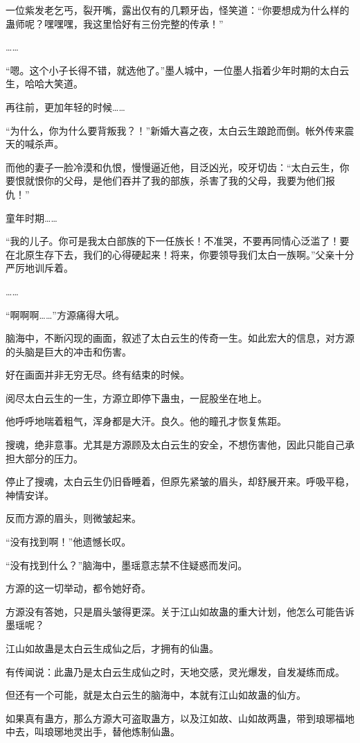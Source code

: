 \begin{this_body}
一位紫发老乞丐，裂开嘴，露出仅有的几颗牙齿，怪笑道：“你要想成为什么样的蛊师呢？嘿嘿嘿，我这里恰好有三份完整的传承！”

……

“嗯。这个小子长得不错，就选他了。”墨人城中，一位墨人指着少年时期的太白云生，哈哈大笑道。

再往前，更加年轻的时候……

“为什么，你为什么要背叛我？！”新婚大喜之夜，太白云生踉跄而倒。帐外传来震天的喊杀声。

而他的妻子一脸冷漠和仇恨，慢慢逼近他，目泛凶光，咬牙切齿：“太白云生，你要恨就恨你的父母，是他们吞并了我的部族，杀害了我的父母，我要为他们报仇！”

童年时期……

“我的儿子。你可是我太白部族的下一任族长！不准哭，不要再同情心泛滥了！要在北原生存下去，我们的心得硬起来！将来，你要领导我们太白一族啊。”父亲十分严厉地训斥着。

……

“啊啊啊……”方源痛得大吼。

脑海中，不断闪现的画面，叙述了太白云生的传奇一生。如此宏大的信息，对方源的头脑是巨大的冲击和伤害。

好在画面并非无穷无尽。终有结束的时候。

阅尽太白云生的一生，方源立即停下蛊虫，一屁股坐在地上。

他呼呼地喘着粗气，浑身都是大汗。良久。他的瞳孔才恢复焦距。

搜魂，绝非意事。尤其是方源顾及太白云生的安全，不想伤害他，因此只能自己承担大部分的压力。

停止了搜魂，太白云生仍旧昏睡着，但原先紧皱的眉头，却舒展开来。呼吸平稳，神情安详。

反而方源的眉头，则微皱起来。

“没有找到啊！”他遗憾长叹。

“没有找到什么？”脑海中，墨瑶意志禁不住疑惑而发问。

方源的这一切举动，都令她好奇。

方源没有答她，只是眉头皱得更深。关于江山如故蛊的重大计划，他怎么可能告诉墨瑶呢？

江山如故蛊是太白云生成仙之后，才拥有的仙蛊。

有传闻说：此蛊乃是太白云生成仙之时，天地交感，灵光爆发，自发凝练而成。

但还有一个可能，就是太白云生的脑海中，本就有江山如故蛊的仙方。

如果真有蛊方，那么方源大可盗取蛊方，以及江如故、山如故两蛊，带到琅琊福地中去，叫琅琊地灵出手，替他炼制仙蛊。


\end{this_body}
